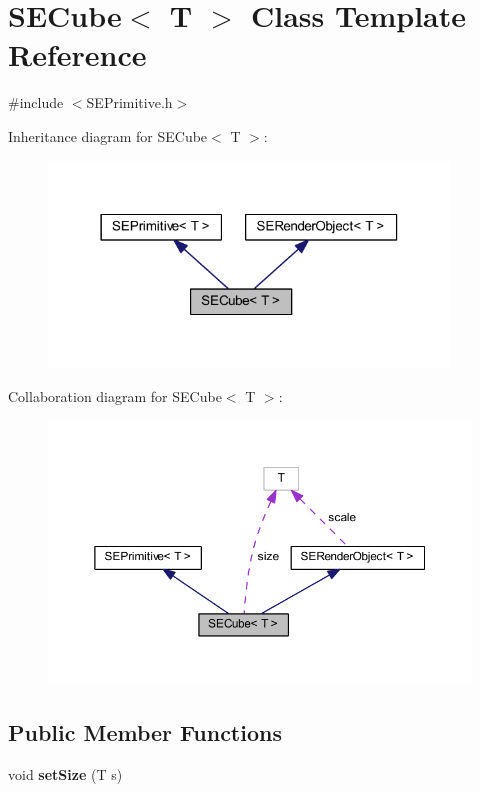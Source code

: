 \section{S\+E\+Cube$<$ T $>$ Class Template Reference}
\label{class_s_e_cube}


{\ttfamily \#include $<$S\+E\+Primitive.\+h$>$}



Inheritance diagram for S\+E\+Cube$<$ T $>$\+:
\nopagebreak
\begin{figure}[H]
\begin{center}
\leavevmode
\includegraphics[width=302pt]{class_s_e_cube__inherit__graph}
\end{center}
\end{figure}


Collaboration diagram for S\+E\+Cube$<$ T $>$\+:
\nopagebreak
\begin{figure}[H]
\begin{center}
\leavevmode
\includegraphics[width=350pt]{class_s_e_cube__coll__graph}
\end{center}
\end{figure}
\subsection*{Public Member Functions}
\begin{DoxyCompactItemize}
\item 
void {\bf set\+Size} (T s)
\end{DoxyCompactItemize}
